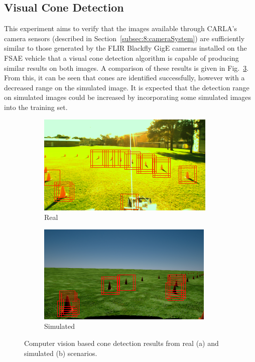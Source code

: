 \subsection{Visual Cone Detection} \label{subsec:8:visualConeDetection}
This experiment aims to verify that the images available through CARLA's camera sensors (described in Section~\ref{subsec:8:cameraSystem}) are sufficiently similar to those generated by the FLIR Blackfly GigE cameras installed on the FSAE vehicle that a visual cone detection algorithm is capable of producing similar results on both images.
A comparison of these results is given in Fig.~\ref{fig:8:cameraOutputs}.
From this, it can be seen that cones are identified successfully, however with a decreased range on the simulated image.
It is expected that the detection range on simulated images could be increased by incorporating some simulated images into the training set.

\begin{figure}[H]
	\centering
	\begin{subfigure}[b]{0.45\textwidth}
		\includegraphics[width=\textwidth]{cameraOutputReal}
		\caption{Real}
		\label{fig:8:cameraOutputs:real}   
	\end{subfigure} 
	\hspace{1em}         
	\begin{subfigure}[b]{0.45\textwidth}
		\includegraphics[width=\textwidth]{cameraOutputSim}
		\caption{Simulated}
		\label{fig:8:cameraOutputs:sim}
	\end{subfigure}             
	\caption[Computer vision based cone detection results]{Computer vision based cone detection results from real (a) and simulated (b) scenarios.}
	\label{fig:8:cameraOutputs}
\end{figure}

